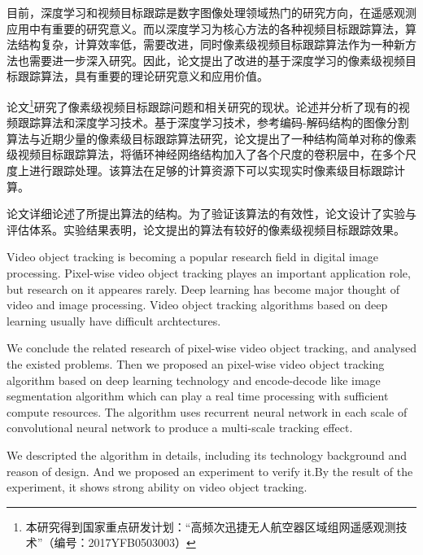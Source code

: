 
\begin{cabstract}
	目前，深度学习和视频目标跟踪是数字图像处理领域热门的研究方向，在遥感观测应用中有重要的研究意义。而以深度学习为核心方法的各种视频目标跟踪算法，算法结构复杂，计算效率低，需要改进，同时像素级视频目标跟踪算法作为一种新方法也需要进一步深入研究。因此，论文提出了改进的基于深度学习的像素级视频目标跟踪算法，具有重要的理论研究意义和应用价值。
	\par
	论文\footnote{本研究得到国家重点研发计划：“高频次迅捷无人航空器区域组网遥感观测技术”（编号：2017YFB0503003）}研究了像素级视频目标跟踪问题和相关研究的现状。论述并分析了现有的视频跟踪算法和深度学习技术。基于深度学习技术，参考编码-解码结构的图像分割算法与近期少量的像素级目标跟踪算法研究，论文提出了一种结构简单对称的像素级视频目标跟踪算法，将循环神经网络结构加入了各个尺度的卷积层中，在多个尺度上进行跟踪处理。该算法在足够的计算资源下可以实现实时像素级目标跟踪计算。
	\par
	论文详细论述了所提出算法的结构。为了验证该算法的有效性，论文设计了实验与评估体系。实验结果表明，论文提出的算法有较好的像素级视频目标跟踪效果。
\end{cabstract}

\begin{eabstract}
	Video object tracking is becoming a popular research field in digital image processing. Pixel-wise video object tracking playes an important application role, but research on it appeares rarely. Deep learning has become major thought of video and image processing. Video object tracking algorithms based on deep learning usually have difficult archtectures. 
	\par
	We conclude the related research of pixel-wise video object tracking, and analysed the existed problems. Then we proposed an pixel-wise video object tracking algorithm based on deep learning technology and encode-decode like image segmentation algorithm which can play a real time processing with sufficient compute resources. The algorithm uses recurrent neural network in each scale of convolutional neural network to produce a multi-scale tracking effect.
	\par
	We descripted the algorithm in details, including its technology background and reason of design. And we proposed an experiment to verify it.By the result of the experiment, it shows strong ability on video object tracking.
\end{eabstract}

